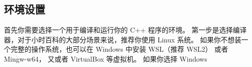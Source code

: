 
\subsection{环境设置}
首先你需要选择一个用于编译和运行你的 C++ 程序的环境。 第一步是选择编译器，对于小时百科的大部分场景来说，推荐你使用 Linux 系统。 如果你不想装一个完整的操作系统，也可以在 Windows 中安装 WSL（推荐 WSL2） 或者 Mingw-w64， 又或者 VirtualBox 等虚拟机。 如果你选择 Windows 
